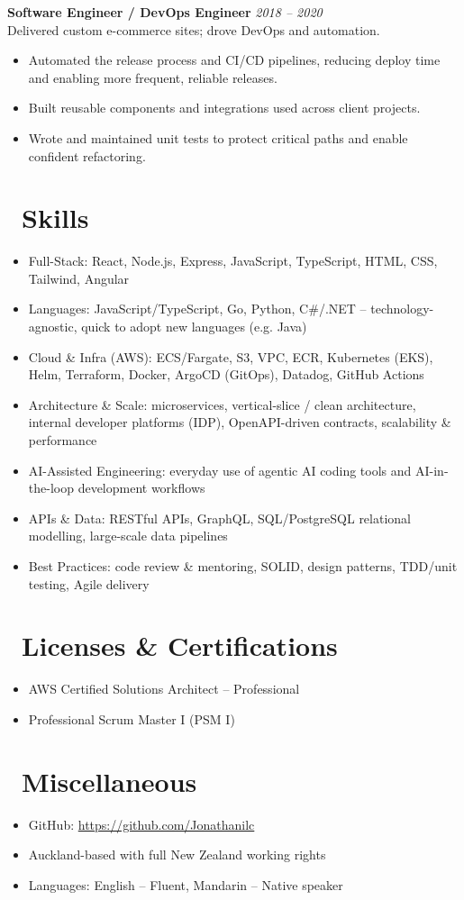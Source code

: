 \documentclass{resume}
\begin{document}
\vspace{1em}

\textbf{Software Engineer / DevOps Engineer} \hfill \textit{2018 -- 2020} \\
Delivered custom e-commerce sites; drove DevOps and automation.
\begin{itemize}
  \item Automated the release process and CI/CD pipelines, reducing deploy time and enabling more frequent, reliable releases.
  \item Built reusable components and integrations used across client projects.
  \item Wrote and maintained unit tests to protect critical paths and enable confident refactoring.
\end{itemize}


\section{\faCogs\ Skills}
\begin{itemize}[parsep=0.5ex]
  \item Full-Stack: React, Node.js, Express, JavaScript, TypeScript, HTML, CSS, Tailwind, Angular
  \item Languages: JavaScript/TypeScript, Go, Python, C\#/.NET -- technology-agnostic, quick to adopt new languages (e.g. Java)
  \item Cloud \& Infra (AWS): ECS/Fargate, S3, VPC, ECR, Kubernetes (EKS), Helm, Terraform, Docker, ArgoCD (GitOps), Datadog, GitHub Actions
  \item Architecture \& Scale: microservices, vertical-slice / clean architecture, internal developer platforms (IDP), OpenAPI-driven contracts, scalability \& performance
  \item AI-Assisted Engineering: everyday use of agentic AI coding tools and AI-in-the-loop development workflows
  \item APIs \& Data: RESTful APIs, GraphQL, SQL/PostgreSQL relational modelling, large-scale data pipelines
  \item Best Practices: code review \& mentoring, SOLID, design patterns, TDD/unit testing, Agile delivery
\end{itemize}

\section{\faHeartO\ Licenses \& Certifications}
\begin{itemize}[parsep=0.5ex]
  \item AWS Certified Solutions Architect -- Professional
  \item Professional Scrum Master I (PSM I)
\end{itemize}


\section{\faInfo\ Miscellaneous}
\begin{itemize}[parsep=0.5ex]
  \item GitHub: \url{https://github.com/Jonathanilc}
  \item Auckland-based with full New Zealand working rights
  \item Languages: English -- Fluent, Mandarin -- Native speaker
\end{itemize}
\end{document}
